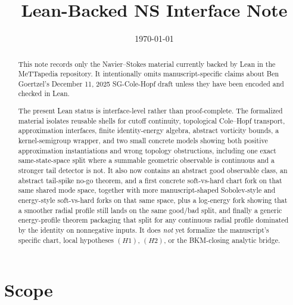 \documentclass[11pt]{article}
\title{Lean-Backed NS Interface Note}
\author{}
\date{\today}
\begin{document}
\maketitle

\begin{abstract}
This note records only the Navier--Stokes material currently backed by Lean in
the MeTTapedia repository.  It intentionally omits manuscript-specific claims
about Ben Goertzel's December 11, 2025 SG-Cole-Hopf draft unless they have been
encoded and checked in Lean.

The present Lean status is interface-level rather than proof-complete.  The
formalized material isolates reusable shells for cutoff continuity, topological
Cole--Hopf transport, approximation interfaces, finite identity-energy
algebra, abstract vorticity bounds, a kernel-semigroup wrapper, and two small
concrete models showing both positive approximation instantiations and wrong
topology obstructions, including one exact same-state-space split where a
summable geometric observable is continuous and a stronger tail detector is
not.  It also now contains an abstract good observable class, an abstract
tail-spike no-go theorem, and a first concrete soft-vs-hard chart fork on that
same shared mode space, together with more manuscript-shaped Sobolev-style and
energy-style soft-vs-hard forks on that same space, plus a log-energy fork
showing that a smoother radial profile still lands on the same good/bad split,
and finally a generic energy-profile theorem packaging that split for any
continuous radial profile dominated by the identity on nonnegative inputs.  It
does \emph{not} yet formalize the manuscript's specific chart, local
hypotheses \((H1)\), \((H2)\), or the BKM-closing analytic bridge.
\end{abstract}

\section{Scope}
\end{document}
